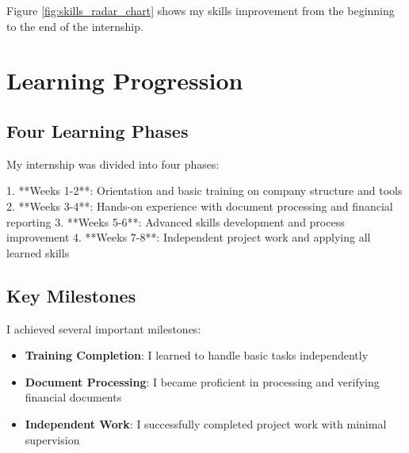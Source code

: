 Figure \ref{fig:skills_radar_chart} shows my skills improvement from the beginning to the end of the internship.

\section{Learning Progression}

\subsection{Four Learning Phases}
My internship was divided into four phases:

1. **Weeks 1-2**: Orientation and basic training on company structure and tools
2. **Weeks 3-4**: Hands-on experience with document processing and financial reporting
3. **Weeks 5-6**: Advanced skills development and process improvement
4. **Weeks 7-8**: Independent project work and applying all learned skills

\subsection{Key Milestones}
I achieved several important milestones:

\begin{itemize}[leftmargin=*, itemsep=0.25em]
    \item \textbf{Training Completion}: I learned to handle basic tasks independently
    \item \textbf{Document Processing}: I became proficient in processing and verifying financial documents
    \item \textbf{Independent Work}: I successfully completed project work with minimal supervision
\end{itemize}

